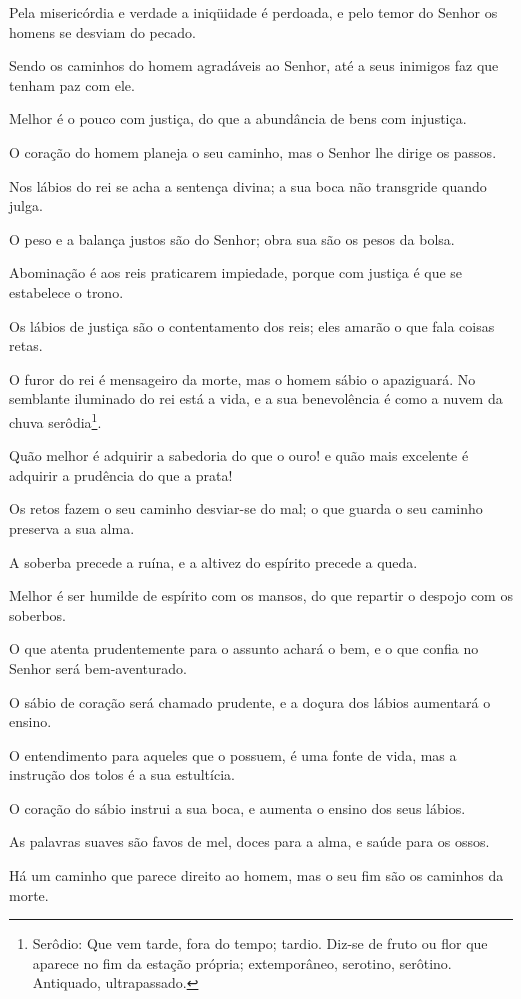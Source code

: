 Pela misericórdia e verdade a iniqüidade é perdoada, e pelo temor
do Senhor os homens se desviam do pecado.

Sendo os caminhos do homem agradáveis ao Senhor, até a seus
inimigos faz que tenham paz com ele.

Melhor é o pouco com justiça, do que a abundância de bens com
injustiça.

O coração do homem planeja o seu caminho, mas o Senhor lhe dirige
os passos.

Nos lábios do rei se acha a sentença divina; a sua boca não
transgride quando julga.

O peso e a balança justos são do Senhor; obra sua são os pesos da
bolsa.

Abominação é aos reis praticarem impiedade, porque com justiça é
que se estabelece o trono.

Os lábios de justiça são o contentamento dos reis; eles amarão o
que fala coisas retas.

O furor do rei é mensageiro da morte, mas o homem sábio o
apaziguará. No semblante iluminado do rei está a vida, e a
sua benevolência é como a nuvem da chuva serôdia\footnote{Serôdio:
Que vem tarde, fora do tempo; tardio. Diz-se de fruto ou flor que
aparece no fim da estação própria; extemporâneo, serotino, serôtino.
Antiquado, ultrapassado.}.

Quão melhor é adquirir a sabedoria do que o ouro! e quão mais
excelente é adquirir a prudência do que a prata!

Os retos fazem o seu caminho desviar-se do mal; o que guarda o
seu caminho preserva a sua alma.

A soberba precede a ruína, e a altivez do espírito precede a
queda.

Melhor é ser humilde de espírito com os mansos, do que repartir o
despojo com os soberbos.

O que atenta prudentemente para o assunto achará o bem, e o que
confia no Senhor será bem-aventurado.

O sábio de coração será chamado prudente, e a doçura dos lábios
aumentará o ensino.

O entendimento para aqueles que o possuem, é uma fonte de vida,
mas a instrução dos tolos é a sua estultícia.

O coração do sábio instrui a sua boca, e aumenta o ensino dos
seus lábios.

As palavras suaves são favos de mel, doces para a alma, e saúde
para os ossos.

Há um caminho que parece direito ao homem, mas o seu fim são os
caminhos da morte.

